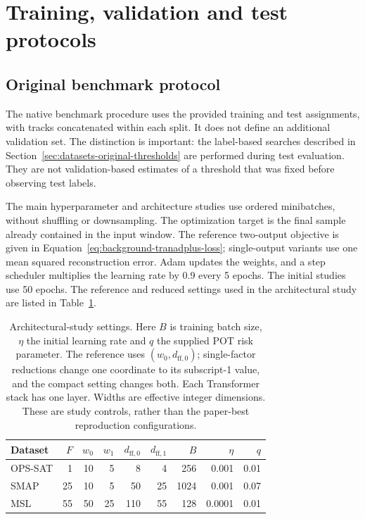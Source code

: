 \section{Training, validation and test protocols}
\label{sec:datasets-training}
\subsection{Original benchmark protocol}
\label{sec:datasets-original-protocol}
The native benchmark procedure uses the provided training and test
assignments, with tracks concatenated within each split. It does not define
an additional validation set. The distinction is important: the label-based
searches described in Section~\ref{sec:datasets-original-thresholds} are
performed during test evaluation. They are not validation-based estimates
of a threshold that was fixed before observing test labels.

The main hyperparameter and architecture studies use ordered minibatches,
without shuffling or downsampling. The optimization target is the final
sample already contained in the input window. The reference two-output
objective is given in Equation~\eqref{eq:background-tranadplus-loss};
single-output variants use one mean squared reconstruction error. Adam
updates the weights, and a step scheduler multiplies the learning rate by
\num{0.9} every \num{5} epochs. The initial studies use \num{50} epochs.
The reference and reduced settings used in the architectural study are
listed in Table~\ref{tab:datasets-study-settings}.

\begin{table}[htbp]
  \centering
  \small
  \setlength{\tabcolsep}{5pt}
  \begin{tabular}{@{}lrrrrrrrr@{}}
    \toprule
    Dataset & \(F\) & \(w_0\) & \(w_1\) & \(d_{\mathrm{ff},0}\) & \(d_{\mathrm{ff},1}\) & \(B\) & \(\eta\) & \(q\) \\
    \midrule
    \acs{OPS-SAT} & 1 & 10 & 5 & 8 & 4 & 256 & \num{0.001} & \num{0.01} \\
    \acs{SMAP} & 25 & 10 & 5 & 50 & 25 & 1024 & \num{0.001} & \num{0.07} \\
    \acs{MSL} & 55 & 50 & 25 & 110 & 55 & 128 & \num{0.0001} & \num{0.01} \\
    \bottomrule
  \end{tabular}
  \caption{Architectural-study settings. Here \(B\) is training batch size,
  \(\eta\) the initial learning rate and \(q\) the supplied \acs{POT} risk
  parameter. The reference uses \((w_0,d_{\mathrm{ff},0})\); single-factor
  reductions change one coordinate to its subscript-1 value, and the compact
  setting changes both. Each Transformer stack has one layer. Widths are
  effective integer dimensions. These are
  study controls, rather than the paper-best reproduction configurations.}
  \label{tab:datasets-study-settings}
\end{table}

